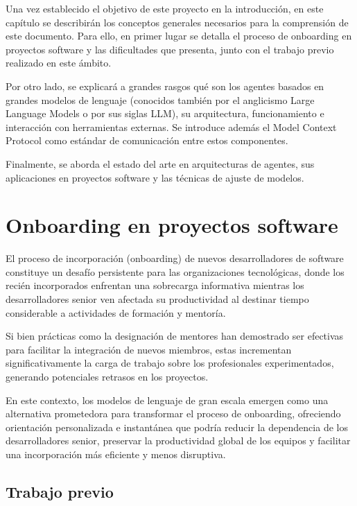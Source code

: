 Una vez establecido el objetivo de este proyecto en la introducción, en este capítulo se describirán los conceptos generales necesarios para la comprensión de este documento. Para ello, en primer lugar se detalla el proceso de onboarding en proyectos software y las dificultades que presenta, junto con el trabajo previo realizado en este ámbito.

Por otro lado, se explicará a grandes rasgos qué son los agentes basados en grandes modelos de lenguaje (conocidos también por el anglicismo Large Language Models o por sus siglas LLM), su arquitectura, funcionamiento e interacción con herramientas externas. Se introduce además el Model Context Protocol como estándar de comunicación entre estos componentes.

Finalmente, se aborda el estado del arte en arquitecturas de agentes, sus aplicaciones en proyectos software y las técnicas de ajuste de modelos.

\section{Onboarding en proyectos software}
El proceso de incorporación (onboarding) de nuevos desarrolladores de software constituye un desafío persistente para las organizaciones tecnológicas, donde los recién incorporados enfrentan una sobrecarga informativa mientras los desarrolladores senior ven afectada su productividad al destinar tiempo considerable a actividades de formación y mentoría\cite{sim_ramp-up_1998}. 

Si bien prácticas como la designación de mentores han demostrado ser efectivas para facilitar la integración de nuevos miembros, estas incrementan significativamente la carga de trabajo sobre los profesionales experimentados, generando potenciales retrasos en los proyectos\cite{steinmacher_systematic_2015}.

En este contexto, los modelos de lenguaje de gran escala emergen como una alternativa prometedora para transformar el proceso de onboarding, ofreciendo orientación personalizada e instantánea que podría reducir la dependencia de los desarrolladores senior, preservar la productividad global de los equipos y facilitar una incorporación más eficiente y menos disruptiva\cite{ritz_artificial_2023}.

\subsection{Trabajo previo}
\label{sec:trabajo_previo}

